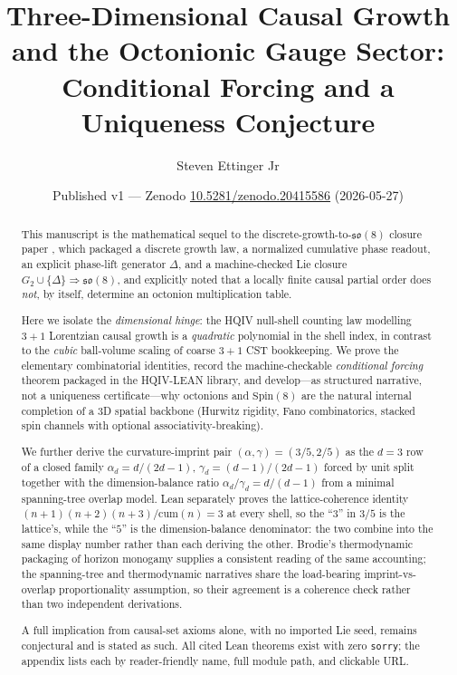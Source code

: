 \documentclass[11pt]{amsart}
\title[Three-Dimensional Causal Growth and Octonionic Gauge]{Three-Dimensional Causal Growth\\
and the Octonionic Gauge Sector:\\
Conditional Forcing and a Uniqueness Conjecture}
\author{Steven Ettinger Jr}
\date{Published v1 --- Zenodo \href{https://doi.org/10.5281/zenodo.20415586}{10.5281/zenodo.20415586} (2026-05-27)}
\begin{document}
\begin{abstract}
This manuscript is the mathematical sequel to the discrete-growth-to-\(\mathfrak{so}(8)\) closure paper \cite{hqiv-so8-paper}, which packaged a discrete growth law, a normalized cumulative phase readout, an explicit phase-lift generator \(\Delta\), and a machine-checked Lie closure \(G_2\cup\{\Delta\}\Rightarrow\mathfrak{so}(8)\), and explicitly noted that a locally finite causal partial order does \emph{not}, by itself, determine an octonion multiplication table.

Here we isolate the \emph{dimensional hinge}: the HQIV null-shell counting law modelling \(3{+}1\) Lorentzian causal growth is a \emph{quadratic} polynomial in the shell index, in contrast to the \emph{cubic} ball-volume scaling of coarse \(3{+}1\) CST bookkeeping. We prove the elementary combinatorial identities, record the machine-checkable \emph{conditional forcing} theorem packaged in the HQIV-LEAN library, and develop---as structured narrative, not a uniqueness certificate---why octonions and \(\mathrm{Spin}(8)\) are the natural internal completion of a \(3\)D spatial backbone (Hurwitz rigidity, Fano combinatorics, stacked spin channels with optional associativity-breaking).

We further derive the curvature-imprint pair \((\alpha,\gamma)=(3/5,2/5)\) as the \(d=3\) row of a closed family \(\alpha_d=d/(2d-1)\), \(\gamma_d=(d-1)/(2d-1)\) forced by unit split together with the dimension-balance ratio \(\alpha_d/\gamma_d=d/(d-1)\) from a minimal spanning-tree overlap model. Lean separately proves the lattice-coherence identity \((n+1)(n+2)(n+3)/\mathrm{cum}(n)=3\) at every shell, so the ``\(3\)'' in \(3/5\) is the lattice's, while the ``\(5\)'' is the dimension-balance denominator: the two combine into the same display number rather than each deriving the other. Brodie's thermodynamic packaging of horizon monogamy \cite{brodie2026} supplies a consistent reading of the same accounting; the spanning-tree and thermodynamic narratives share the load-bearing imprint-vs-overlap proportionality assumption, so their agreement is a coherence check rather than two independent derivations.

A full implication from causal-set axioms alone, with no imported Lie seed, remains conjectural and is stated as such. All cited Lean theorems exist with zero \texttt{sorry}; the appendix lists each by reader-friendly name, full module path, and clickable URL.
\end{abstract}
\maketitle
\end{document}
